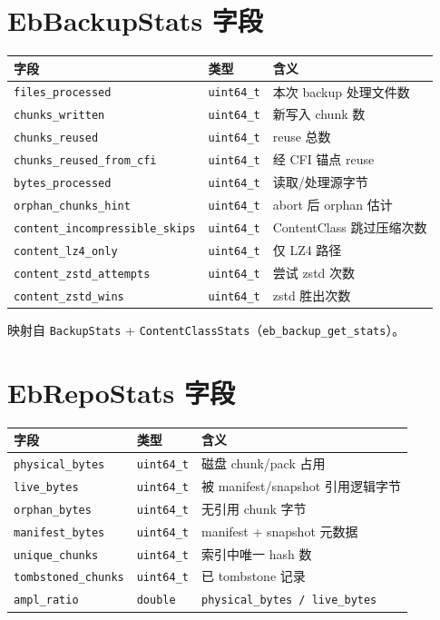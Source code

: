\section{EbBackupStats 字段}

\begin{longtable}{@{}llp{8cm}@{}}
\toprule
字段 & 类型 & 含义 \\
\midrule
\texttt{files\_processed} & \texttt{uint64\_t} & 本次 backup 处理文件数 \\
\texttt{chunks\_written} & \texttt{uint64\_t} & 新写入 chunk 数 \\
\texttt{chunks\_reused} & \texttt{uint64\_t} & reuse 总数 \\
\texttt{chunks\_reused\_from\_cfi} & \texttt{uint64\_t} & 经 CFI 锚点 reuse \\
\texttt{bytes\_processed} & \texttt{uint64\_t} & 读取/处理源字节 \\
\texttt{orphan\_chunks\_hint} & \texttt{uint64\_t} & abort 后 orphan 估计 \\
\texttt{content\_incompressible\_skips} & \texttt{uint64\_t} & ContentClass 跳过压缩次数 \\
\texttt{content\_lz4\_only} & \texttt{uint64\_t} & 仅 LZ4 路径 \\
\texttt{content\_zstd\_attempts} & \texttt{uint64\_t} & 尝试 zstd 次数 \\
\texttt{content\_zstd\_wins} & \texttt{uint64\_t} & zstd 胜出次数 \\
\bottomrule
\end{longtable}

映射自 \texttt{BackupStats} + \texttt{ContentClassStats}（\texttt{eb\_backup\_get\_stats}）。

\section{EbRepoStats 字段}

\begin{longtable}{@{}llp{8cm}@{}}
\toprule
字段 & 类型 & 含义 \\
\midrule
\texttt{physical\_bytes} & \texttt{uint64\_t} & 磁盘 chunk/pack 占用 \\
\texttt{live\_bytes} & \texttt{uint64\_t} & 被 manifest/snapshot 引用逻辑字节 \\
\texttt{orphan\_bytes} & \texttt{uint64\_t} & 无引用 chunk 字节 \\
\texttt{manifest\_bytes} & \texttt{uint64\_t} & manifest + snapshot 元数据 \\
\texttt{unique\_chunks} & \texttt{uint64\_t} & 索引中唯一 hash 数 \\
\texttt{tombstoned\_chunks} & \texttt{uint64\_t} & 已 tombstone 记录 \\
\texttt{ampl\_ratio} & \texttt{double} & \texttt{physical\_bytes / live\_bytes} \\
\bottomrule
\end{longtable}

